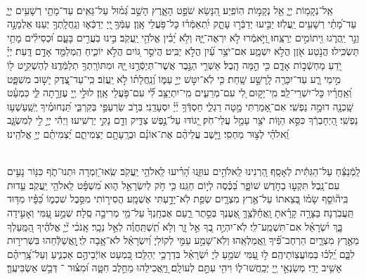 \documentclass[twoside, openany, parskip=half, 11pt]{book}
\begin{document}
\\
 אֵֽל־נְקָמ֥וֹת יְיָ֑ אֵ֖ל נְקָמ֣וֹת הֽוֹפִֽיַע׃ הִ֭נָּשֵׂא שֹׁפֵ֣ט הָאָ֑רֶץ הָשֵׁ֣ב גְּ֝מ֗וּל עַל־גֵּאִֽים׃ עַד־מָתַ֖י רְשָׁעִ֥ים יְיָ֑ עַד־מָ֝תַ֗י רְשָׁעִ֥ים יַֽעֲלֹֽזוּ׃ יַבִּ֣יעוּ יְדַבְּֿר֣וּ עָתָ֑ק יִֽ֝תְאַמְּֿר֗וּ כָּל־פֹּ֥עֲלֵי אָֽוֶן׃ עַמְּֿךָ֥ ֖יְיָ יְדַכְּֿא֑וּ וְנַֽחֲלָֽתְךָ֥ יְעַנּֽוּ׃ אַלְמָנָ֣ה וְגֵ֣ר יַֽהֲרֹ֑גוּ וִ֖יתוֹמִ֣ים יְרַצֵּֽחוּ׃ וַ֭יֹּ֣אמְֿרוּ לֹ֣א יִרְאֶה־יָּ֑הּ וְלֹ֥א יָ֝בִ֗ין אֱלֹהֵ֥י יַֽעֲקֹֽב׃ בִּ֣ינוּ בֹֽעֲרִ֣ים בָּעָ֑ם וּ֝כְסִילִ֗ים מָתַ֥י תַּשְׂכִּֽילוּ׃ הֲנֹ֣טַע אֹ֖זֶן הֲלֹ֣א יִשְׁמָ֑ע אִם־יֹצֵ֥ר עַ֝֗יִן הֲלֹ֣א יַבִּֽיט׃ הֲיֹסֵ֣ר גּ֭וֹיִם הֲלֹ֣א יוֹכִ֑יחַ הַֽמְלַמֵּ֖ד אָדָ֣ם דָּֽעַת׃ יְיָ֗ יֹ֭דֵעַ מַחְשְֿׁב֣וֹת אָדָ֑ם כִּ֖י הֵ֣מָּה הָֽבֶל׃ אַשְׁרֵ֤י הַגֶּ֣בֶר אֲשֶׁר־תְּיַסְּֿרֶ֣נּוּ יָּ֑הּ וּמִתּוֹרָֽתְךָ֥ תְלַמְּֿדֶֽנּוּ׃ לְהַשְׁקִ֣יט ל֖וֹ מִ֣ימֵי רָ֑ע עַד־יִכָּרֶ֖ה לָֽרָשָׁ֣ע שָֽׁחַת׃ כִּ֤י לֹֽא־יִטּ֣שׁ יְיָ֣ עַמּ֑וֹ וְ֝נַֽחֲלָת֗וֹ לֹ֣א יַֽעֲזֹֽב׃ כִּֽי־עַד־צֶ֭דֶק יָשׁ֣וּב מִשְׁפָּ֑ט וְ֝אַֽחֲרָ֗יו כָּל־יִשְׁרֵי־לֵֽב׃ מִֽי־יָק֣וּם לִ֭י עִם־מְרֵעִ֑ים מִֽי־יִתְיַצֵּ֥ב לִ֝֗י עִם־פֹּ֥עֲלֵי אָֽוֶן׃ לוּלֵ֣י יְ֖יָ עֶזְרָ֣תָה לִּ֑י כִּמְעַ֓ט שָֽׁכְנָ֖ה דוּמָ֣ה נַפְשִֽׁי׃ אִם־אָ֭מַרְתִּי מָ֣טָה רַגְלִ֑י חַסְדְּֿךָ֥ יְ֜יָ֗ יִסְעָדֵֽנִי׃ בְּרֹ֣ב שַׂרְעַפַּ֣י בְּקִרְבִּ֑י תַּ֝נְחוּמֶ֗יךָ יְֽשַֽׁעַשְׁע֥וּ נַפְשִֽׁי׃ הַ֭יְחָבְרְֿךָ כִּסֵּ֣א הַוּ֑וֹת יֹצֵ֖ר עָמָ֣ל עֲלֵי־חֹֽק׃ יָ֭גוֹדּוּ עַל־נֶ֣פֶשׁ צַדִּ֑יק וְדָ֖ם נָקִ֣י יַרְשִֽׁיעוּ׃ וַיְהִ֬י יְיָ֣ לִ֣י לְמִשְׂגָּ֑ב וֵֽ֝אלֹהַ֗י לְצ֣וּר מַחְסִֽי׃  וַיָּ֤שֶׁב עֲלֵיהֶ֨ם אֶת־אוֹנָ֗ם וּבְרָֽעָתָ֥ם יַצְמִיתֵ֑ם יַ֝צְמִיתֵ֗ם יְיָ֥ אֱלֹהֵֽינוּ׃


\\
 לַֽמְֿנַצֵּ֬חַ עַל־הַגִּתִּ֬ית לְאָסָֽף׃ הַ֭רְנִינוּ לֵֽאלֹהִ֣ים עוּזֵּ֑נוּ הָ֝רִ֗יעוּ לֵֽאלֹהֵ֥י יַֽעֲקֹֽב׃ שְֽׂאוּ־זִ֭מְרָה וּתְנוּ־תֹ֑ף כִּנּ֖וֹר נָעִ֣ים עִם־נָֽבֶל׃ תִּקְע֣וּ בַחֹ֣דֶשׁ שׁוֹפָ֑ר בַּ֝כֶּ֗סֶה לְי֣וֹם חַגֵּֽנוּ׃ כִּ֤י חֹ֣ק לְיִשְׂרָאֵ֣ל ה֑וּא מִ֝שְׁפָּ֗ט לֵֽאלֹהֵ֥י יַֽעֲקֹֽב׃ עֵ֤דוּת בִּֽיה֘וֹסֵ֤ף שָׂמ֗וֹ בְּ֭צֵאתוֹ עַל־אֶ֣רֶץ מִצְרָ֑יִם שְׂפַ֖ת לֹֽא־יָדַ֣עְתִּי אֶשְׁמָֽע׃ הֲסִיר֣וֹתִי מִסֵּ֣בֶל שִׁכְמ֑וֹ כַּ֝פָּ֗יו מִדּ֥וּד תַּֽעֲבֹֽרְנָה׃ בַּצָּרָ֥ה קָרָ֗אתָ וָֽאֲחַ֫לְּֿצֶ֥ךָּ אֶ֭עֶנְךָ בְּסֵ֣תֶר רַ֑עַם אֶבְחָֽנְךָ֙ עַל־מֵ֖י מְרִיבָ֣ה סֶֽלָה׃ שְׁמַ֣ע עַ֭מִּי וְאָעִ֣ידָה בָּ֑ךְ יִ֝שְׂרָאֵ֗ל אִם־תִּשְׁמַֽע־לִֽי׃ לֹֽא־יִהְיֶ֣ה בְ֭ךָ אֵ֣ל זָ֑ר וְלֹ֥א תִֽ֝שְׁתַּֽחֲוֶ֗ה לְאֵ֣ל נֵכָֽר׃ אָֽנֹכִ֨י יְ֘יָ֤ אֱלֹהֶ֗יךָ הַ֭מַּֽעַלְךָ מֵאֶ֣רֶץ מִצְרָ֑יִם הַרְחֶב־פִּ֝֗יךָ וַֽאֲמַלְאֵֽהוּ׃ וְלֹֽא־שָׁמַ֣ע עַמִּ֣י לְקוֹלִי֑ וְ֝יִשְׂרָאֵ֗ל לֹא־אָ֥בָה לִֽי׃ ֖וָֽאֲשַׁלְּֿחֵהוּ בִּשְׁרִיר֣וּת לִבָּ֑ם יֵֽ֝לְכ֗וּ בְּמֽוֹעֲצֽוֹתֵיהֶֽם׃ ל֣וּ עַ֭מִּי שֹׁמֵ֣עַ לִי֑ יִ֝שְׂרָאֵ֗ל בִּדְרָכַ֥י יְהַלֵּֽכוּ׃ כִּ֭מְעַט אֽוֹיְֿבֵיהֶ֣ם אַכְנִ֑יעַ וְעַל־צָֽ֝רֵיהֶ֗ם אָשִׁ֥יב יָדִֽי׃ מְשַׂנְאֵ֣י יְ֖יָ יְכַֽחֲשׁוּ־ל֑וֹ וִיהִ֖י עִתָּ֣ם לְעוֹלָֽם׃  וַ֭יַּֽאֲכִילֵהוּ מֵחֵ֣לֶב חִטָּ֑ה וּ֝מִצּ֗וּר ־ דְּבַ֣שׁ אַשְׂבִּיעֶֽךָּ׃
\end{document}
